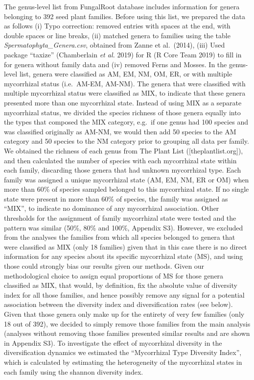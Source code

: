 \documentclass[12pt,]{article}
\begin{document}
The genus-level list from FungalRoot database includes information for
genera belonging to 392 seed plant families. Before using this list, we
prepared the data as follows (i) Typo correction: removed entries with
spaces at the end, with double spaces or line breaks, (ii) matched
genera to families using the table \emph{Spermatophyta\_Genera.csv},
obtained from Zanne et al.~(2014), (iii) Used package ``taxize''
(Chamberlain \emph{et al.} 2019) for R (R Core Team 2019) to fill in for
genera without family data and (iv) removed Ferns and Mosses. In the
genus-level list, genera were classified as AM, EM, NM, OM, ER, or with
multiple mycorrhizal status (i.e.~AM-EM, AM-NM). The genera that were
classified with multiple mycorrhizal status were classified as MIX, to
indicate that these genera presented more than one mycorrhizal state.
Instead of using MIX as a separate mycorrhizal status, we divided the
species richness of those genera equally into the types that composed
the MIX category, e.g.~if one genus had 100 species and was classified
originally as AM-NM, we would then add 50 species to the AM category and
50 species to the NM category prior to grouping all data per family. We
obtained the richness of each genus from The Plant List
({[}theplantlist.org{]}), and then calculated the number of species with
each mycorrhizal state within each family, discarding those genera that
had unknown mycorrhizal type. Each family was assigned a unique
mycorrhizal state (AM, EM, NM, ER or OM) when more than 60\% of species
sampled belonged to this mycorrhizal state. If no single state were
present in more than 60\% of species, the family was assigned as
``MIX'', to indicate no dominance of any mycorrhizal association. Other
thresholds for the assignment of family mycorrhizal state were tested
and the pattern was similar (50\%, 80\% and 100\%, Appendix S3).
However, we excluded from the analyses the families from which all
species belonged to genera that were classified as MIX (only 18
families) given that in this case there is no direct information for any
species about its specific mycorrhizal state (MS), and using those could
strongly bias our results given our methods. Given our methodological
choice to assign equal proportions of MS for those genera classified as
MIX, that would, by definition, fix the absolute value of diversity
index for all those families, and hence possibly remove any signal for a
potential association between the diversity index and diversification
rates (see below). Given that those genera only make up for the entirety
of very few families (only 18 out of 392), we decided to simply remove
those families from the main analysis (analyses without removing those
families presented similar results and are shown in Appendix S3). To
investigate the effect of mycorrhizal diversity in the diversification
dynamics we estimated the ``Mycorrhizal Type Diversity Index'', which is
calculated by estimating the heterogeneity of the mycorrhizal states in
each family using the shannon diversity index.
\end{document}
